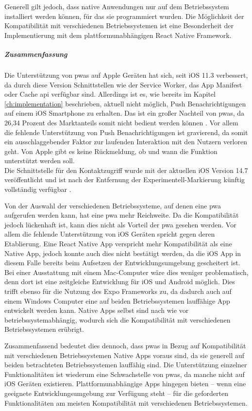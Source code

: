 Generell gilt jedoch, dass native Anwendungen nur auf dem Betriebssystem installiert werden können, für das sie programmiert wurden.
Die Möglichkeit der Kompatibilität mit verschiedenen Betriebssystemen ist eine Besonderheit der Implementierung mit dem plattformunabhängigen React Native Framework.

\subparagraph{Zusammenfassung\\}
Die Unterstützung von \acp{pwa} auf Apple Geräten hat sich, seit iOS 11.3 verbessert, da durch diese Version Schnittstellen wie der Service Worker, das App Manifest oder Cache \ac{api} verfügbar sind.
Allerdings ist es, wie bereits im Kapitel \ref{ch:implementation} beschrieben, aktuell nicht möglich, Push Benachrichtigungen auf einem iOS Smartphone zu erhalten.
Das ist ein großer Nachteil von \acp{pwa}, da 26,34 Prozent des Marktanteils somit nicht bedient werden können \cite{ODea.2021}.
Vor allem die fehlende Unterstützung von Push Benachrichtigungen ist gravierend, da somit ein ausschlaggebender Faktor zur laufenden Interaktion mit den Nutzern verloren geht.
Von Apple gibt es keine Rückmeldung, ob und wann die Funktion unterstützt werden soll.\\%
Die Schnittstelle für den Kontaktzugriff wurde mit der aktuellen iOS Version 14.7 veröffentlicht und ist nach der Entfernung der Experimentell-Markierung künftig vollständig verfügbar \cite{Firtman.2021}.

Von der Auswahl der verschiedenen Betriebssysteme, auf denen eine \ac{pwa} aufgerufen werden kann, hat eine \ac{pwa} mehr Reichweite.
Da die Kompatibilität jedoch lückenhaft ist, kann dies nicht als Vorteil der \ac{pwa} gesehen werden.
Vor allem die fehlende Unterstützung von iOS Geräten spricht gegen deren Etablierung.
Eine React Native App verspricht mehr Kompatibilität als eine Native App, jedoch konnte auch dies nicht bestätigt werden, da die iOS App in diesem Falle bereits beim Aufsetzen der Entwicklungsumgebung gescheitert ist.
Bei einer Ausstattung mit einem Mac-Computer wäre dies weniger problematisch, denn dort ist eine zeitgleiche Entwicklung für iOS und Android möglich.
Dies trifft ebenso für die Nutzung des Expo Frameworks zu, da dadurch auch auf einem Windows Computer eine auf beiden Betriebssystemen lauffähige App entwickelt werden kann.
Native Apps selbst sind nach wie vor betriebssystemabhängig, wodurch sich die Kompatibilität mit verschiedenen Betriebssystemen erübrigt.

Zusammenfassend bedeutet dies dennoch, dass \acp{pwa} in Bezug auf Kompatibilität mit verschiedenen Betriebssystemen Native Apps voraus sind, da sie generell auf beiden betrachteten Betriebssystemen lauffähig sind.
Die Unterstützung einzelner Funktionalitäten ist wiederum eine Schwachstelle von \acp{pwa}, da manche nicht auf iOS Geräten existieren.
Plattformunabhängige Apps hingegen bieten -- wenn eine geeignete Entwicklungsumgebung zur Verfügung steht -- für die geforderten Funktionalitäten am meisten Kompatibilität mit verschiedenen Betriebssystemen.

